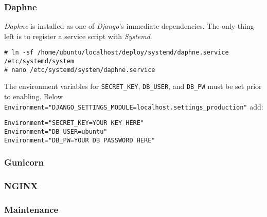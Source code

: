 \subsubsection{Daphne}

\emph{Daphne} is installed as one of \emph{Django}'s immediate dependencies. The only thing left is to register a service script with \emph{Systemd}.
\begin{lstlisting}
# ln -sf /home/ubuntu/localhost/deploy/systemd/daphne.service /etc/systemd/system
# nano /etc/systemd/system/daphne.service
\end{lstlisting}
The environment variables for \lstinline{SECRET_KEY}, \lstinline{DB_USER}, and \lstinline{DB_PW} must be set prior to enabling. Below \lstinline{Environment="DJANGO_SETTINGS_MODULE=localhost.settings_production"} add:

\begin{lstlisting}
Environment="SECRET_KEY=YOUR KEY HERE"
Environment="DB_USER=ubuntu"
Environment="DB_PW=YOUR DB PASSWORD HERE"
\end{lstlisting}


\subsubsection{Gunicorn}
\subsubsection{NGINX}
\subsubsection{Maintenance}

